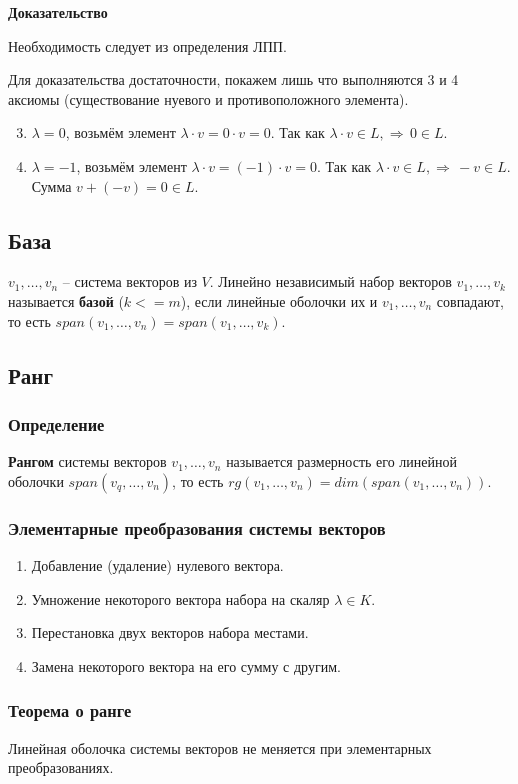 \documentclass{article}
\begin{document}
\textbf{Доказательство}

Необходимость следует из определения ЛПП.

Для доказательства достаточности, покажем лишь что выполняются 3 и 4 аксиомы (существование нуевого и противоположного элемента).
\begin{enumerate}
    \setcounter{enumi}{2}
    \item $\lambda=0$, возьмём элемент $\lambda\cdot v=0\cdot v=0$. Так как $\lambda\cdot v\in L,\Rightarrow\,0\in L$.
    \item $\lambda=-1$, возьмём элемент $\lambda\cdot v=(-1)\cdot v=0$. Так как $\lambda\cdot v\in L,\Rightarrow\,-v\in L$. Сумма $v+(-v)=0\in L$.
\end{enumerate}
\subsection{База}
$v_1,\ldots,v_n$ -- система векторов из $V$. Линейно независимый набор векторов $v_1,\ldots,v_k$ называется \textbf{базой} ($k<=m$), если линейные оболочки их и $v_1,\ldots,v_n$ совпадают, то есть $span(v_1,\ldots,v_n)=span(v_1,\ldots,v_k)$.
\subsection{Ранг}
\subsubsection{Определение}
\textbf{Рангом} системы векторов $v_1,\ldots,v_n$ называется размерность его линейной оболочки $span(v_q,\ldots,v_n)$, то есть $rg(v_1,\ldots,v_n)=dim(span(v_1,\ldots,v_n))$.

\newpage
\subsubsection{Элементарные преобразования системы векторов}
\begin{enumerate}
    \item Добавление (удаление) нулевого вектора.
    \item Умножение некоторого вектора набора на скаляр $\lambda\in K$.
    \item Перестановка двух векторов набора местами.
    \item Замена некоторого вектора на его сумму с другим.
\end{enumerate}
\subsubsection{Теорема о ранге}
Линейная оболочка системы векторов не меняется при элементарных преобразованиях.
\end{document}
